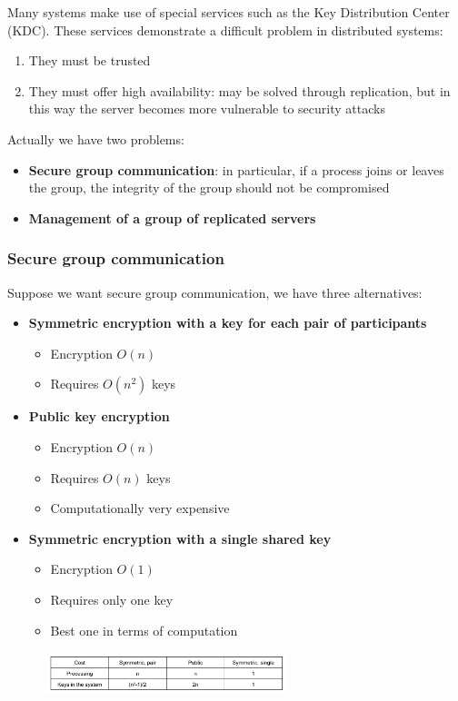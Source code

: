 \documentclass[10pt,a4paper]{article}
\begin{document}
Many systems make use of special services such as the Key Distribution Center (KDC). These services demonstrate a difficult problem in distributed systems:
\begin{enumerate}
	\item They must be trusted
	\item They must offer high availability: may be solved through replication, but in this way the server becomes more vulnerable to security attacks
\end{enumerate}
Actually we have two problems:
\begin{itemize}
	\item \textbf{Secure group communication}: in particular, if a process joins or leaves the group, the integrity of the group should not be compromised
	\item \textbf{Management of a group of replicated servers}
\end{itemize}
\subsubsection{Secure group communication}
Suppose we want secure group communication, we have three alternatives:
\begin{itemize}
	\item \textbf{Symmetric encryption with a key for each pair of participants}
	\begin{itemize}
		\item Encryption $O(n)$
		\item Requires $O(n^2)$ keys
	\end{itemize}
	\item \textbf{Public key encryption}
	\begin{itemize}
		\item Encryption $O(n)$
		\item Requires $O(n)$ keys
		\item Computationally very expensive
	\end{itemize}
	\item \textbf{Symmetric encryption with a single shared key}
	\begin{itemize}
		\item Encryption $O(1)$
		\item Requires only one key
		\item Best one in terms of computation
	\end{itemize}
\end{itemize}
\begin{figure}[h!]\hfill \includegraphics[width=200pt]{images/secure-group.png}\hspace*{\fill}
  \label{fig:secure-group}
\end{figure}  
\end{document}
